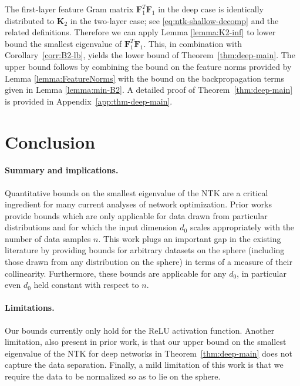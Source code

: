 \documentclass{article}
\theoremstyle{definition}
\def\mF{{\bm{F}}}
\def\mK{{\bm{K}}}
\begin{document}
The first-layer feature Gram matrix $\mF_1^T \mF_1$ in the deep case is identically distributed to $\mK_2$ in the two-layer case; see \eqref{eq:ntk-shallow-decomp} and the related definitions. Therefore we can apply Lemma \ref{lemma:K2-inf} to lower bound the smallest eigenvalue of $\mF_1^T \mF_1$. This, in combination with Corollary~\ref{corr:B2-lb}, yields the lower bound of Theorem~\ref{thm:deep-main}. 
The upper bound follows by combining the bound on the feature norms provided by Lemma \ref{lemma:FeatureNorms} with the bound on the backpropagation terms given in Lemma \ref{lemma:min-B2}. 
A detailed proof of Theorem~\ref{thm:deep-main} is provided in Appendix~\ref{app:thm-deep-main}. 












\section{Conclusion}

\paragraph{Summary and implications.} 
Quantitative bounds on the smallest eigenvalue of the NTK are a critical ingredient for many current analyses of network optimization. Prior works provide bounds which are only applicable for data drawn from particular distributions and for which the input dimension $d_0$ scales appropriately with the number of data samples $n$. This work plugs an important gap in the existing literature by providing bounds for arbitrary datasets on the sphere (including those drawn from any distribution on the sphere) in terms of a measure of their collinearity. Furthermore, these bounds are applicable for any $d_0$, in particular even $d_0$ held constant with respect to $n$.


\paragraph{Limitations.} Our bounds currently only hold for the ReLU activation function. 
Another limitation, also present in prior work, is that our upper bound on the smallest eigenvalue of the NTK for deep networks in Theorem~\ref{thm:deep-main} does not capture the data separation. Finally, a mild limitation of this work is that we require the data to be normalized so as to lie on the sphere. 
\end{document}
